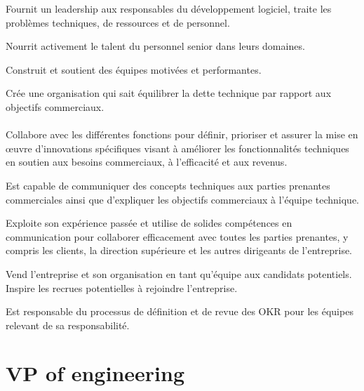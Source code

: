 \documentclass[a4paper, french, openany, 12pt]{book}
\newcommand\cha[1]{\textcolor{OliveGreen}{\textbf{\bsc{Cha-{#1}}}}}
\begin{document}
\begin{multicols}{2}
  Fournit un leadership aux responsables du développement logiciel, traite les problèmes techniques, de ressources et de 
  personnel.

  Nourrit activement le talent du personnel senior dans leurs domaines.

  Construit et soutient des équipes motivées et performantes.

  Crée une organisation qui sait équilibrer la dette technique par rapport aux objectifs commerciaux.

  \subsubsection*{\cha{TODO}}

  Collabore avec les différentes fonctions pour définir, prioriser et assurer la mise en œuvre d'innovations spécifiques 
  visant à améliorer les fonctionnalités techniques en soutien aux besoins commerciaux, à l'efficacité et aux revenus.

  Est capable de communiquer des concepts techniques aux parties prenantes commerciales ainsi que d'expliquer les 
  objectifs commerciaux à l'équipe technique.

  Exploite son expérience passée et utilise de solides compétences en communication pour collaborer efficacement avec 
  toutes les parties prenantes, y compris les clients, la direction supérieure et les autres dirigeants de l'entreprise.

  Vend l'entreprise et son organisation en tant qu'équipe aux candidats potentiels. 
  Inspire les recrues potentielles à rejoindre l'entreprise.

  Est responsable du processus de définition et de revue des OKR pour les équipes relevant de sa responsabilité.

\end{multicols}

\chapter{VP of engineering}
\end{document}
